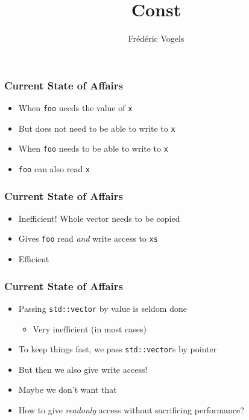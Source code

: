 \usepackage{ucll-code}
\usetikzlibrary{shadows,shapes.multipart}

\title{Const}
\author{Fr\'ed\'eric Vogels}





\begin{frame}
  \titlepage
\end{frame}

\begin{frame}
  \frametitle{Current State of Affairs}
  \begin{itemize}
    \item When \texttt{foo} needs the value of \texttt{x}
    \item But does not need to be able to write to \texttt{x}
  \end{itemize}
  \vskip2mm
  \begin{itemize}
    \item When \texttt{foo} needs to be able to write to \texttt{x}
    \item \texttt{foo} can also read \texttt{x}
  \end{itemize}
\end{frame}

\begin{frame}
  \frametitle{Current State of Affairs}
  \begin{itemize}
    \item Inefficient! Whole vector needs to be copied
  \end{itemize}
  \vskip2mm
  \begin{itemize}
    \item Gives \texttt{foo} read \emph{and} write access to \texttt{xs}
    \item Efficient
  \end{itemize}
\end{frame}

\begin{frame}
  \frametitle{Current State of Affairs}
  \begin{itemize}
    \item Passing \texttt{std::vector} by value is seldom done
          \begin{itemize}
            \item Very inefficient (in most cases)
          \end{itemize}
    \item To keep things fast, we pass \texttt{std::vector}s by pointer
    \item But then we also give write access!
    \item Maybe we don't want that
    \item How to give \emph{readonly} access without sacrificing performance?
  \end{itemize}
\end{frame}


